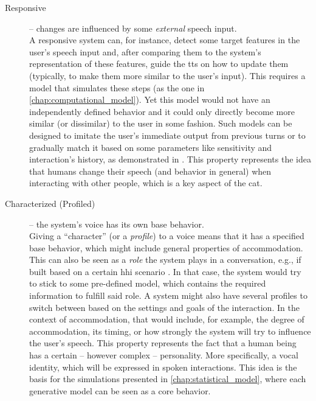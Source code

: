 \begin{description}
	\item[Responsive] -- changes are influenced by some \emph{external} speech input.\\
	A responsive system can, for instance, detect some target features in the user's speech input and, after comparing them to the system's representation of these features, guide the \ac{tts} on how to update them (typically, to make them more similar to the user's input).
	This requires a model that simulates these steps (as the one in \cref{chap:computational_model}).
	Yet this model would not have an independently defined behavior and it could only directly become more similar (or dissimilar) to the user in some fashion.
	Such models can be designed to imitate the user's immediate output from previous turns \citep[like in][]{Levitan2016implementing} or to gradually match it based on some parameters like sensitivity and interaction's history, as demonstrated in \citet{Raveh2017Interspeech}.
	This property represents the idea that humans change their speech (and behavior in general) when interacting with other people, which is a key aspect of the \ac{cat}.
	
	\item[Characterized (Profiled)] -- the system's voice has its own base behavior.\\
	Giving a \enquote{character} (or a \emph{profile}) to a voice means that it has a specified base behavior, which might include general properties of accommodation.
	This can also be seen as a \emph{role} the system plays in a conversation, e.g., if built based on a certain \ac{hhi} scenario \citep{Silber-Varod2018prosodic}.
	In that case, the system would try to stick to some pre-defined model, which contains the required information to fulfill said role.
	A system might also have several profiles to switch between based on the settings and goals of the interaction.
	In the context of accommodation, that would include, for example, the degree of accommodation, its timing, or how strongly the system will try to influence the user's speech.
	This property represents the fact that a human being has a certain -- however complex -- personality.
	More specifically, a vocal identity, which will be expressed in spoken interactions.
	This idea is the basis for the simulations presented in \cref{chap:statistical_model}, where each generative model can be seen as a core behavior.
	

\end{description}
